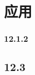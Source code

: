 
\chapter{应用}
\label{chap:12}


\subsection{12.1.2}
\label{sec:12.1.2}

\section{12.3}
\label{sec:12.3}